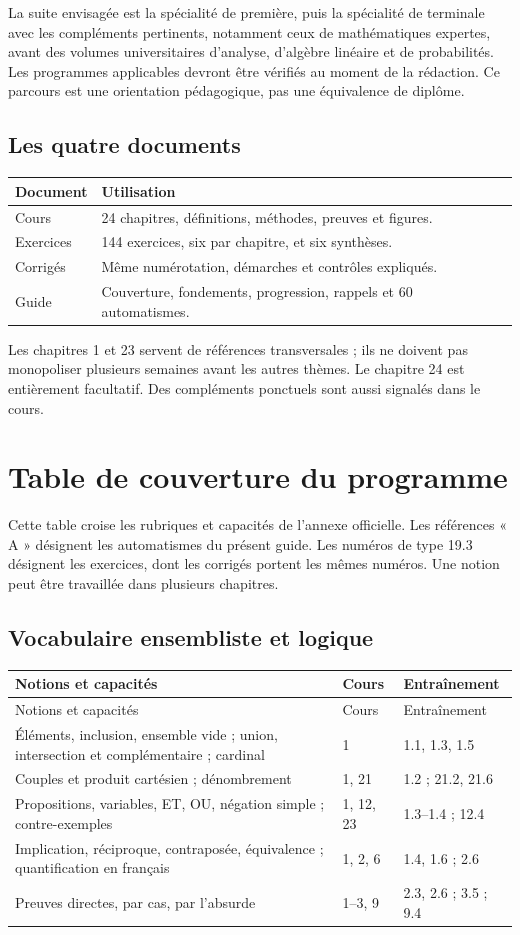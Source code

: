 \documentclass[11pt,a4paper,oneside]{book}
\begin{document}
La suite envisagée est la spécialité de première, puis la spécialité de terminale avec les compléments pertinents, notamment ceux de mathématiques expertes, avant des volumes universitaires d'analyse, d'algèbre linéaire et de probabilités. Les programmes applicables devront être vérifiés au moment de la rédaction. Ce parcours est une orientation pédagogique, pas une équivalence de diplôme.
\section{Les quatre documents}
\begin{center}\begin{tabularx}{\textwidth}{lX}\toprule
Document & Utilisation\\\midrule
Cours & 24 chapitres, définitions, méthodes, preuves et figures.\\
Exercices & 144 exercices, six par chapitre, et six synthèses.\\
Corrigés & Même numérotation, démarches et contrôles expliqués.\\
Guide & Couverture, fondements, progression, rappels et 60 automatismes.\\\bottomrule
\end{tabularx}\end{center}
Les chapitres 1 et 23 servent de références transversales ; ils ne doivent pas monopoliser plusieurs semaines avant les autres thèmes. Le chapitre 24 est entièrement facultatif. Des compléments ponctuels sont aussi signalés dans le cours.
\chapter{Table de couverture du programme}
Cette table croise les rubriques et capacités de l'annexe officielle. Les références « A » désignent les automatismes du présent guide. Les numéros de type 19.3 désignent les exercices, dont les corrigés portent les mêmes numéros. Une notion peut être travaillée dans plusieurs chapitres.
\section{Vocabulaire ensembliste et logique}
\small
\begin{longtable}{p{}p{}p{}}
\toprule Notions et capacités & Cours & Entraînement\\\midrule
\endfirsthead\toprule Notions et capacités & Cours & Entraînement\\\midrule\endhead
Éléments, inclusion, ensemble vide ; union, intersection et complémentaire ; cardinal & 1 & 1.1, 1.3, 1.5\\
Couples et produit cartésien ; dénombrement & 1, 21 & 1.2 ; 21.2, 21.6\\
Propositions, variables, ET, OU, négation simple ; contre-exemples & 1, 12, 23 & 1.3--1.4 ; 12.4\\
Implication, réciproque, contraposée, équivalence ; quantification en français & 1, 2, 6 & 1.4, 1.6 ; 2.6\\
Preuves directes, par cas, par l'absurde & 1--3, 9 & 2.3, 2.6 ; 3.5 ; 9.4\\
\bottomrule\end{longtable}
\normalsize
\end{document}
